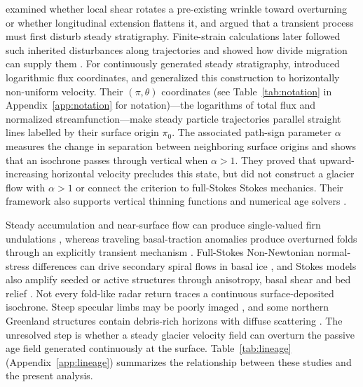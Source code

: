\documentclass[review]{igs}
\providecommand{\DIFadd}[1]{{\protect\color{blue} \sf #1}} %
\providecommand{\DIFdel}[1]{{\protect\color{red} \scriptsize #1}} %
\providecommand{\DIFaddbegin}{} %
\providecommand{\DIFaddend}{} %
\providecommand{\DIFdelbegin}{} %
\providecommand{\DIFdelend}{} %
\newcommand{\DIFscaledelfig}{0.5}
\newlength{\DIFdelgraphicswidth} %
\newlength{\DIFdelgraphicsheight} %
\newcommand{\DIFaddincludegraphics}[2][]{{\color{blue}\fbox{\DIFOincludegraphics[#1]{#2}}}} %
\newcommand{\DIFdelincludegraphics}[2][]{%
\sbox{\DIFdelgraphicsbox}{\DIFOincludegraphics[#1]{#2}}%
\settoboxwidth{\DIFdelgraphicswidth}{\DIFdelgraphicsbox} %
\settoboxtotalheight{\DIFdelgraphicsheight}{\DIFdelgraphicsbox} %
\scalebox{\DIFscaledelfig}{%
\parbox[b]{\DIFdelgraphicswidth}{\usebox{\DIFdelgraphicsbox}\\[-\baselineskip] \rule{\DIFdelgraphicswidth}{0em}}\llap{\resizebox{\DIFdelgraphicswidth}{\DIFdelgraphicsheight}{%
\setlength{\unitlength}{\DIFdelgraphicswidth}%
\begin{picture}(1,1)%
\thicklines\linethickness{2pt} %
{\color[rgb]{1,0,0}\put(0,0){\framebox(1,1){}}}%
{\color[rgb]{1,0,0}\put(0,0){\line( 1,1){1}}}%
{\color[rgb]{1,0,0}\put(0,1){\line(1,-1){1}}}%
\end{picture}%
}\hspace*{3pt}}} %
} %
\DeclareRobustCommand{\DIFaddbegin}{\DIFOaddbegin \let\includegraphics\DIFaddincludegraphics} %
\DeclareRobustCommand{\DIFaddend}{\DIFOaddend \let\includegraphics\DIFOincludegraphics} %
\DeclareRobustCommand{\DIFdelbegin}{\DIFOdelbegin \let\includegraphics\DIFdelincludegraphics} %
\DeclareRobustCommand{\DIFdelend}{\DIFOaddend \let\includegraphics\DIFOincludegraphics} %
\begin{document}
\citet{Waddington2001} examined whether local shear rotates a pre-existing wrinkle toward overturning or whether longitudinal extension flattens it, and argued that a transient process must first disturb steady stratigraphy. Finite-strain calculations later followed such inherited disturbances along trajectories and showed how divide migration can supply them \citep{JacobsonWaddington2004,JacobsonWaddington2005}. For continuously generated steady stratigraphy, \citet{ParreninHindmarshRemy2006} introduced logarithmic flux coordinates, and \citet{ParreninHindmarsh2007} generalized this construction to horizontally non-uniform velocity. Their \((\pi,\theta)\) coordinates (see Table~\ref{tab:notation} \DIFaddbegin \DIFadd{in Appendix~\ref{app:notation} }\DIFaddend for notation)---the logarithms of total flux and normalized streamfunction---make steady particle trajectories parallel straight lines labelled by their surface origin \(\pi_0\). The associated path-sign parameter \(\alpha\) measures the change in separation between neighboring surface origins and shows that an isochrone passes through vertical when \(\alpha>1\). They proved that upward-increasing horizontal velocity precludes this state, but did not construct a glacier flow with \(\alpha>1\) or connect the criterion to \DIFdelbegin \DIFdel{full-Stokes }\DIFdelend \DIFaddbegin \DIFadd{Stokes }\DIFaddend mechanics. Their framework also supports vertical thinning functions and numerical age solvers \citep{Parrenin2013,HindmarshLeysingerVieliParrenin2009,ParreninChungMartin2025}.

Steady accumulation and near-surface flow can produce single-valued firn undulations \citep{NgKing2011,NgKing2013}, whereas traveling basal-traction anomalies produce overturned folds through an explicitly transient mechanism \citep{Wolovick2014,WolovickCreyts2016}. \DIFdelbegin \DIFdel{Full-Stokes }\DIFdelend \DIFaddbegin \DIFadd{Non-Newtonian normal-stress differences can drive secondary spiral flows in basal ice \citep{SchoofClarke2008}, and Stokes }\DIFaddend models also amplify seeded or active structures through anisotropy, basal shear and bed relief \citep{Zhang2024}. Not every fold-like radar return traces a continuous surface-deposited isochrone. Steep specular limbs may be poorly imaged \citep{Holschuh2014}, and some northern Greenland structures contain debris-rich horizons with diffuse scattering \citep{Holschuh2026}. The unresolved step is whether a steady glacier velocity field can overturn the passive age field generated continuously at the surface. Table~\ref{tab:lineage} \DIFaddbegin \DIFadd{(Appendix~\ref{app:lineage}) }\DIFaddend summarizes the relationship between these studies and the present analysis.
\end{document}
